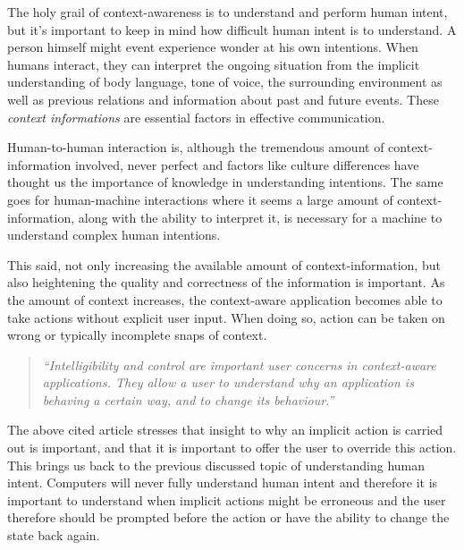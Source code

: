 \documentclass[../report.tex]{subfiles}
\begin{document}
 


The holy grail of context-awareness is to understand and perform human intent, but it's important to keep in mind how difficult human intent is to understand. A person himself might event experience wonder at his own intentions. When humans interact, they can interpret the ongoing situation from the implicit understanding of body language, tone of voice, the surrounding environment as well as previous relations and information about past and future events. These \textit{context informations} are essential factors in effective communication.

Human-to-human interaction is, although the tremendous amount of context-information involved, never perfect and factors like culture differences have thought us the importance of knowledge in understanding intentions. The same goes for human-machine interactions where it seems a large amount of context-information, along with the ability to interpret it, is necessary for a machine to understand complex human intentions.



This said, not only increasing the available amount of context-information, but also heightening the quality and correctness of the information is important. As the amount of context increases, the context-aware application becomes able to take actions without explicit user input. When doing so, action can be taken on wrong or typically incomplete snaps of context. 


\begin{quote}
\textit{``Intelligibility and control are important user concerns in context-aware applications. They allow a user to understand why an application is behaving a certain way, and to change its behaviour.''} \cite{Dey and Newberger (2009)}
\end{quote} 

The above cited article stresses that insight to why an implicit action is carried out is important, and that it is important to offer the user to override this action. This brings us back to the previous discussed topic of understanding human intent. Computers will never fully understand human intent and therefore it is important to understand when implicit actions might be erroneous and the user therefore should be prompted before the action or have the ability to change the state back again.
\end{document}

